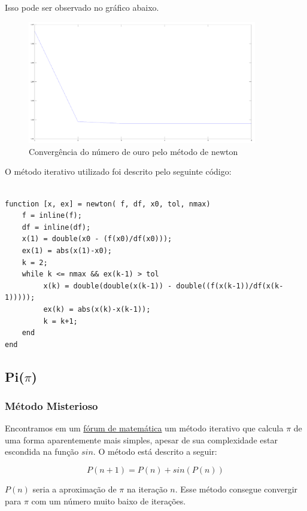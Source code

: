 \documentclass[a4paper]{article}
\begin{document}
Isso pode ser observado no gráfico abaixo.

\begin{figure}[H]
    \centering
    \includegraphics[width=100mm]{golden_newton.png}
    \caption{Convergência do número de ouro pelo método de newton}
    \label{golden_newton}
\end{figure}

O método iterativo utilizado foi descrito pelo seguinte código:

\begin{lstlisting}

function [x, ex] = newton( f, df, x0, tol, nmax)
	f = inline(f);
	df = inline(df);
	x(1) = double(x0 - (f(x0)/df(x0)));
	ex(1) = abs(x(1)-x0);
	k = 2;
	while k <= nmax && ex(k-1) > tol
		 x(k) = double(double(x(k-1)) - double((f(x(k-1))/df(x(k-1)))));
		 ex(k) = abs(x(k)-x(k-1));
		 k = k+1;
	end
end

\end{lstlisting}

\subsection{Pi($\pi$)}

\subsubsection{Método Misterioso}

Encontramos em um \href{http://mathforum.org/library/drmath/view/65244.html}{fórum de matemática} um método iterativo que calcula $\pi$ de uma forma aparentemente mais simples, apesar de sua complexidade estar escondida na função $sin$. O método está descrito a seguir:

\begin{equation}
P(n+1) = P(n) + sin(P(n))
\end{equation}

$P(n)$ seria a aproximação de $\pi$ na iteração $n$. Esse método consegue convergir para $\pi$ com um número muito baixo de iterações.
\end{document}
